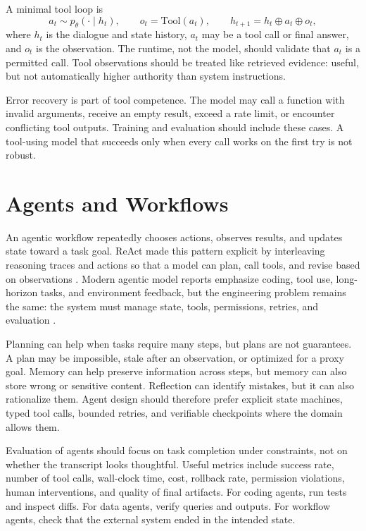 A minimal tool loop is
\begin{equation}
  a_t \sim p_{\theta}(\cdot \mid h_t), \qquad
  o_t = \mathrm{Tool}(a_t), \qquad
  h_{t+1} = h_t \oplus a_t \oplus o_t,
  \label{eq:tool-loop}
\end{equation}
where $h_t$ is the dialogue and state history, $a_t$ may be a tool call or final answer, and $o_t$ is the observation. The runtime, not the model, should validate that $a_t$ is a permitted call. Tool observations should be treated like retrieved evidence: useful, but not automatically higher authority than system instructions.

Error recovery is part of tool competence. The model may call a function with invalid arguments, receive an empty result, exceed a rate limit, or encounter conflicting tool outputs. Training and evaluation should include these cases. A tool-using model that succeeds only when every call works on the first try is not robust.

\section{Agents and Workflows}
\label{sec:agents-workflows}

An agentic workflow repeatedly chooses actions, observes results, and updates state toward a task goal. ReAct made this pattern explicit by interleaving reasoning traces and actions so that a model can plan, call tools, and revise based on observations \cite{yao2023react}. Modern agentic model reports emphasize coding, tool use, long-horizon tasks, and environment feedback, but the engineering problem remains the same: the system must manage state, tools, permissions, retries, and evaluation \cite{kimi2025k2}.

Planning can help when tasks require many steps, but plans are not guarantees. A plan may be impossible, stale after an observation, or optimized for a proxy goal. Memory can help preserve information across steps, but memory can also store wrong or sensitive content. Reflection can identify mistakes, but it can also rationalize them. Agent design should therefore prefer explicit state machines, typed tool calls, bounded retries, and verifiable checkpoints where the domain allows them.

Evaluation of agents should focus on task completion under constraints, not on whether the transcript looks thoughtful. Useful metrics include success rate, number of tool calls, wall-clock time, cost, rollback rate, permission violations, human interventions, and quality of final artifacts. For coding agents, run tests and inspect diffs. For data agents, verify queries and outputs. For workflow agents, check that the external system ended in the intended state.

